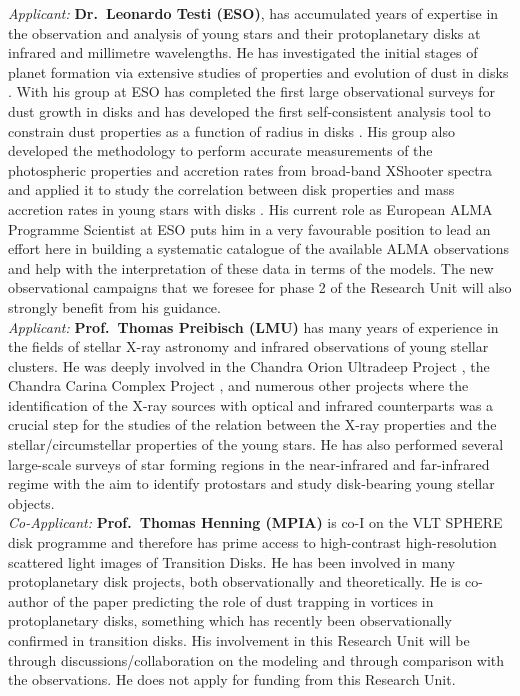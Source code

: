 \documentclass[10pt,fleqn,twoside,a4paper]{article}
\begin{document}
{\it Applicant:} {\bf Dr.\ Leonardo Testi (ESO)}, has accumulated years of expertise
in the observation and analysis of young stars and their protoplanetary
disks at infrared and millimetre wavelengths. He has investigated the initial stages of planet formation via
extensive studies of properties and evolution of dust in disks 
\citep{2003A&A...403..323T, 2014prpl.conf..339T}. 
With his group at ESO has completed the first large observational surveys for dust growth
in disks \citep{2010A&A...512A..15R, 2010A&A...521A..66R}
and has developed the first self-consistent analysis tool to constrain dust properties
as a function of radius in disks \citep{2011A&A...525A..12B, 2013A&A...558A..64T, 
2016A&A...588A..53T}.
His group also developed the methodology to perform accurate measurements of
the photospheric properties and accretion rates from broad-band XShooter
spectra \citep{2013A&A...551A.107M} and applied it to study the correlation
between disk properties and mass accretion rates in young stars with disks
\citep{2016A&A...591L...3M}.
His current role as European ALMA Programme Scientist at ESO
puts him in a very favourable position to lead an effort here in
building a systematic catalogue of the available ALMA observations and help with the interpretation of these data in terms of
the models. The new observational
campaigns that we foresee for phase 2 of the Research Unit will also
strongly 
benefit from his guidance. \\

{\it Applicant:} {\bf Prof.\ Thomas Preibisch (LMU)}  has many years of experience in the
fields of stellar X-ray astronomy and infrared observations
of young stellar clusters.
He was deeply involved in the
Chandra Orion Ultradeep Project \citep[COUP, see][]{2005ApJS..160..401P},
the Chandra Carina Complex Project \citep[CCCP, see][]{2011ApJS..194...10P},
and numerous other projects where
the identification of the X-ray sources with optical
and infrared counterparts was a crucial step for the studies
of the relation between the X-ray properties and the stellar/circumstellar
properties of the young stars. He has also performed several large-scale 
surveys of star forming
regions in the near-infrared \citep[e.g.,][]{2011ApJS..194...10P,
2014A&A...572A.116P}
and far-infrared regime \citep[e.g.,][]{2012A&A...541A.132P}
with the aim to identify protostars and study disk-bearing young
stellar objects.\\

{\it Co-Applicant:} {\bf Prof.\ Thomas Henning (MPIA)}  is co-I
on the VLT SPHERE disk programme and therefore has prime access to
high-contrast high-resolution scattered light images of Transition
Disks. He has been involved in many protoplanetary disk projects, both
observationally and theoretically. He is co-author of the 
\citet{1997Icar..128..213K} paper predicting the role of dust trapping in vortices
in protoplanetary disks, something which has recently been 
observationally confirmed in transition disks. 
His involvement in this
Research Unit will be through discussions/collaboration on the
modeling and through comparison with the observations. He does not apply for 
funding from this Research Unit.\\
\end{document}
